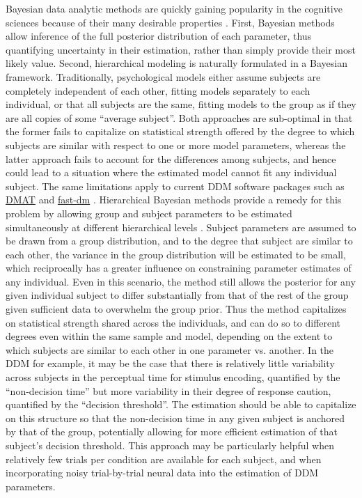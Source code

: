 \documentclass[letterpaper,10pt,english]{article}
\begin{document}
Bayesian data analytic methods are quickly gaining popularity in the cognitive sciences because of their many desirable properties \citep{LeeWagenmakers13,Kruschke10}. First, Bayesian methods allow inference of the full posterior distribution of each parameter, thus quantifying uncertainty in their estimation, rather than simply provide their most likely value. Second, hierarchical modeling is naturally formulated in a Bayesian framework. Traditionally, psychological models either assume subjects are completely independent of each other, fitting models separately to each individual, or that all subjects are the same, fitting models to the group as if they are all copies of some ``average subject''. Both approaches are sub-optimal in that the former fails to capitalize on statistical strength offered by the degree to which subjects are similar with respect to one or more model parameters, whereas the latter approach fails to account for the differences among subjects, and hence could lead to a situation where the estimated model cannot fit any individual subject. The same limitations apply to current DDM software packages such as \href{http://ppw.kuleuven.be/okp/software/dmat/}{DMAT} \citep{VandekerckhoveTuerlinckx08} and \href{http://seehuhn.de/pages/fast-dm}{fast-dm} \citep{VossVoss07}. Hierarchical Bayesian methods provide a remedy for this problem by allowing group and subject parameters to be estimated simultaneously at different hierarchical levels \citep{LeeWagenmakers13,Kruschke10,VandekerckhoveTuerlinckxLee11}. Subject parameters are assumed to be drawn from a group distribution, and to the degree that subject are similar to each other, the variance in the group distribution will be estimated to be small, which reciprocally has a greater influence on constraining parameter estimates of any individual. Even in this scenario, the method still allows the posterior for any given individual subject to differ substantially from that of the rest of the group given sufficient data to overwhelm the group prior. Thus the method capitalizes on statistical strength shared across the individuals, and can do so to different degrees even within the same sample and model, depending on the extent to which subjects are similar to each other in one parameter vs. another. In the DDM for example, it may be the case that there is relatively little variability across subjects in the perceptual time for stimulus encoding, quantified by the ``non-decision time'' but more variability in their degree of response caution, quantified by the ``decision threshold''. The estimation should be able to capitalize on this structure so that the non-decision time in any given subject is anchored by that of the group, potentially allowing for more efficient estimation of that subject's decision threshold. This approach may be particularly helpful when relatively few trials per condition are available for each subject, and when incorporating noisy trial-by-trial neural data into the estimation of DDM parameters.
\end{document}
